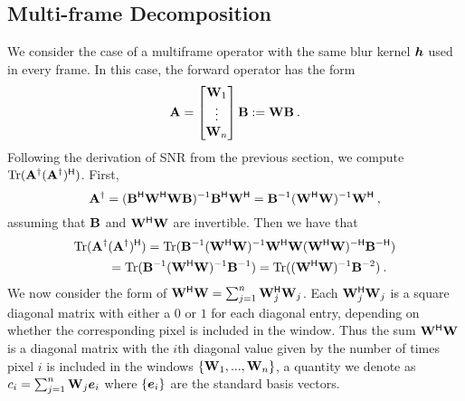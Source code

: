 \subsection{Multi-frame Decomposition}\label{sec:appendix:multiframe_app}

We consider the case of a multiframe operator with the same blur kernel $\bm{h}$ used in every frame. In this case, the forward operator has the form
\begin{equation*}
\mathbf{A} =  \begin{bmatrix}\mathbf{W}_1 \\ \vdots \\ \mathbf{W}_n \end{bmatrix}\mathbf{B} := \mathbf{W}\mathbf{B}\:.
\end{equation*}
 Following the derivation of SNR from the previous section, we compute $\mathrm{Tr}(\mathbf{A}^\dagger (\mathbf{A}^\dagger)^{\mathsf{H}})$. First,
\[\mathbf{A}^\dagger = (\mathbf{B}^{\mathsf{H}} {\mathbf{W}}^{\mathsf{H}}{\mathbf{W}} \mathbf{B})^{-1} \mathbf{B}^{\mathsf{H}} {\mathbf{W}}^{\mathsf{H}} =
\mathbf{B}^{-1} ({\mathbf{W}}^{\mathsf{H}}{\mathbf{W}} )^{-1} {\mathbf{W}}^{\mathsf{H}}\:,\]
assuming that $\mathbf{B}$ and $\mathbf{W}^{\mathsf{H}} \mathbf{W}$ are invertible.
Then we have that
\begin{align*}
    \mathrm{Tr}(\mathbf{A}^\dagger &(\mathbf{A}^\dagger)^{\mathsf{H}}) = \mathrm{Tr}(\mathbf{B}^{-1} ({\mathbf{W}}^{\mathsf{H}}{\mathbf{W}} )^{-1} {\mathbf{W}}^{\mathsf{H}} {\mathbf{W}} ({\mathbf{W}}^{\mathsf{H}}{\mathbf{W}} )^{-\mathsf{H}}
    \mathbf{B}^{-\mathsf{H}}) \\
    &= \mathrm{Tr}(\mathbf{B}^{-1} ({\mathbf{W}}^{\mathsf{H}}{\mathbf{W}} )^{-1}
    \mathbf{B}^{-1}) = \mathrm{Tr}(({\mathbf{W}}^{\mathsf{H}}{\mathbf{W}} )^{-1} \mathbf{B}^{-2} )\:.
\end{align*}
We now consider the form of ${\mathbf{W}}^{\mathsf{H}}{\mathbf{W}} = \sum_{j=1}^n \mathbf{W}_j^{\mathsf{H}} \mathbf{W}_j$. Each $\mathbf{W}_j^{\mathsf{H}} \mathbf{W}_j$ is a square diagonal matrix with either a $0$ or $1$ for each diagonal entry, depending on whether the corresponding pixel is included in the window. Thus the sum ${\mathbf{W}}^{\mathsf{H}} {\mathbf{W}}$ is a diagonal matrix with the $i$th diagonal value given by the number of times pixel $i$ is included in the windows $\{\mathbf{W}_1,...,\mathbf{W}_n\}$, a quantity we denote as $c_i = \sum_{j=1}^n \mathbf{W}_j \bm{e}_i$ where $\{\bm{e}_i\}$ are the standard basis vectors.

